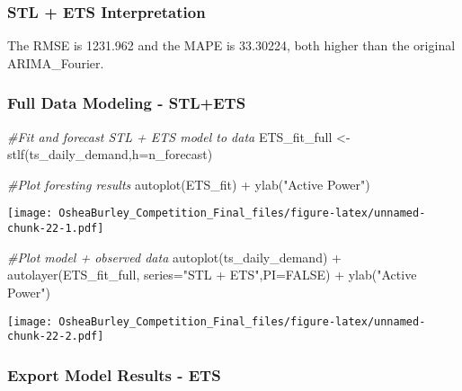 \documentclass[
]{article}
\newenvironment{Shaded}{\begin{snugshade}}{\end{snugshade}}
\newcommand{\AttributeTok}[1]{\textcolor[rgb]{0.77,0.63,0.00}{#1}}
\newcommand{\CommentTok}[1]{\textcolor[rgb]{0.56,0.35,0.01}{\textit{#1}}}
\newcommand{\ConstantTok}[1]{\textcolor[rgb]{0.00,0.00,0.00}{#1}}
\newcommand{\FunctionTok}[1]{\textcolor[rgb]{0.00,0.00,0.00}{#1}}
\newcommand{\NormalTok}[1]{#1}
\newcommand{\OtherTok}[1]{\textcolor[rgb]{0.56,0.35,0.01}{#1}}
\newcommand{\SpecialCharTok}[1]{\textcolor[rgb]{0.00,0.00,0.00}{#1}}
\newcommand{\StringTok}[1]{\textcolor[rgb]{0.31,0.60,0.02}{#1}}
\begin{document}
\hypertarget{stl-ets-interpretation}{%
\subsubsection{STL + ETS Interpretation}\label{stl-ets-interpretation}}

The RMSE is 1231.962 and the MAPE is 33.30224, both higher than the
original ARIMA\_Fourier.

\hypertarget{full-data-modeling---stlets}{%
\subsubsection{Full Data Modeling -
STL+ETS}\label{full-data-modeling---stlets}}

\begin{Shaded}
\begin{Highlighting}[]
\CommentTok{\#Fit and forecast STL + ETS model to data}
\NormalTok{ETS\_fit\_full }\OtherTok{\textless{}{-}}  \FunctionTok{stlf}\NormalTok{(ts\_daily\_demand,}\AttributeTok{h=}\NormalTok{n\_forecast)}

\CommentTok{\#Plot foresting results}
\FunctionTok{autoplot}\NormalTok{(ETS\_fit) }\SpecialCharTok{+} \FunctionTok{ylab}\NormalTok{(}\StringTok{"Active Power"}\NormalTok{)}
\end{Highlighting}
\end{Shaded}

\texttt{[image: OsheaBurley\_Competition\_Final\_files/figure-latex/unnamed-chunk-22-1.pdf]}

\begin{Shaded}
\begin{Highlighting}[]
\CommentTok{\#Plot model + observed data}
\FunctionTok{autoplot}\NormalTok{(ts\_daily\_demand) }\SpecialCharTok{+}
  \FunctionTok{autolayer}\NormalTok{(ETS\_fit\_full, }\AttributeTok{series=}\StringTok{"STL + ETS"}\NormalTok{,}\AttributeTok{PI=}\ConstantTok{FALSE}\NormalTok{) }\SpecialCharTok{+}
  \FunctionTok{ylab}\NormalTok{(}\StringTok{"Active Power"}\NormalTok{)}
\end{Highlighting}
\end{Shaded}

\texttt{[image: OsheaBurley\_Competition\_Final\_files/figure-latex/unnamed-chunk-22-2.pdf]}

\hypertarget{export-model-results---ets}{%
\subsubsection{Export Model Results -
ETS}\label{export-model-results---ets}}
\end{document}
